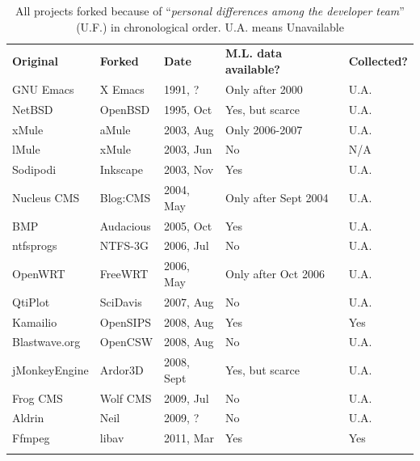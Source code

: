 \documentclass{report}
\begin{document}
\begin{table}[!ht]
\centering
\caption{All projects forked because of ``\textit{personal differences among the developer team}'' (U.F.) \cite{Robles} in chronological order. U.A. means Unavailable}
\label{tabelProjectsForkedCat1PersonalDiffereces}       
\begin{tabular}{m{} m{} m{} m{} m{}}
\hline\noalign{\smallskip}
\textbf{Original} & \textbf{Forked} & \textbf{Date} & \textbf{M.L. data available?} & \textbf{Collected?}\\
\noalign{\smallskip}\hline\noalign{\smallskip}
GNU Emacs & X Emacs & 1991, ? & Only after 2000 & U.A. \\ \hline
NetBSD & OpenBSD & 1995, Oct & Yes, but scarce & U.A. \\ \hline
xMule & aMule & 2003, Aug & Only 2006-2007 & U.A. \\ \hline
lMule & xMule & 2003, Jun & No & N/A \\ \hline
Sodipodi & Inkscape & 2003, Nov & Yes & U.A.\\ \hline
Nucleus CMS & Blog:CMS & 2004, May & Only after Sept 2004 & U.A. \\ \hline
BMP & Audacious & 2005, Oct & Yes & U.A. \\ \hline
ntfsprogs & NTFS-3G & 2006, Jul & No & U.A. \\ \hline
OpenWRT & FreeWRT & 2006, May & Only after Oct 2006 & U.A. \\ \hline
QtiPlot & SciDavis & 2007, Aug & No & U.A. \\ \hline
Kamailio & OpenSIPS & 2008, Aug & Yes & Yes \\ \hline
Blastwave.org & OpenCSW & 2008, Aug & No & U.A. \\ \hline
jMonkeyEngine & Ardor3D & 2008, Sept & Yes, but scarce & U.A. \\ \hline
Frog CMS & Wolf CMS & 2009, Jul & No & U.A. \\ \hline
Aldrin & Neil & 2009, ? & No & U.A. \\ \hline
Ffmpeg & libav & 2011, Mar & Yes & Yes\\
\noalign{\smallskip}\hline
\end{tabular}
\end{table}
\end{document}
